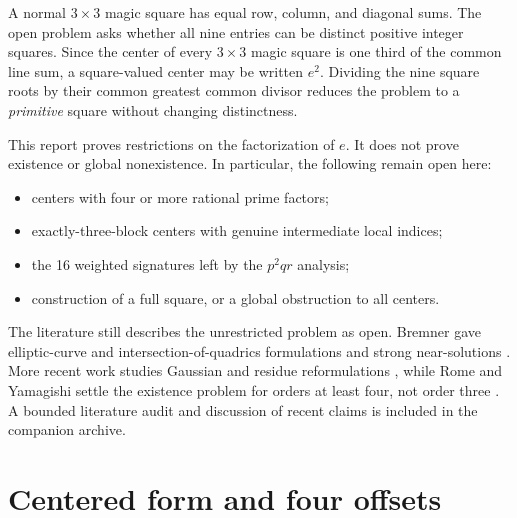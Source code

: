 \documentclass[11pt]{article}
\theoremstyle{definition}
\theoremstyle{remark}
\begin{document}
A normal $3\times3$ magic square has equal row, column, and diagonal sums.
The open problem asks whether all nine entries can be distinct positive
integer squares.  Since the center of every $3\times3$ magic square is one
third of the common line sum, a square-valued center may be written $e^2$.
Dividing the nine square roots by their common greatest common divisor reduces
the problem to a \emph{primitive} square without changing distinctness.

This report proves restrictions on the factorization of $e$.  It does not
prove existence or global nonexistence.  In particular, the following remain
open here:
\begin{itemize}[leftmargin=2em]
  \item centers with four or more rational prime factors;
  \item exactly-three-block centers with genuine intermediate local indices;
  \item the 16 weighted signatures left by the $p^2qr$ analysis;
  \item construction of a full square, or a global obstruction to all centers.
\end{itemize}

The literature still describes the unrestricted problem as open.  Bremner
gave elliptic-curve and intersection-of-quadrics formulations and strong
near-solutions \cite{bremner1999,bremner2001}.  More recent work studies
Gaussian and residue reformulations \cite{woll2018,cain2019,wolird2023}, while
Rome and Yamagishi settle the existence problem for orders at least four, not
order three \cite{rome2025}.  A bounded literature audit and discussion of
recent claims is included in the companion archive.

\section{Centered form and four offsets}
\end{document}
